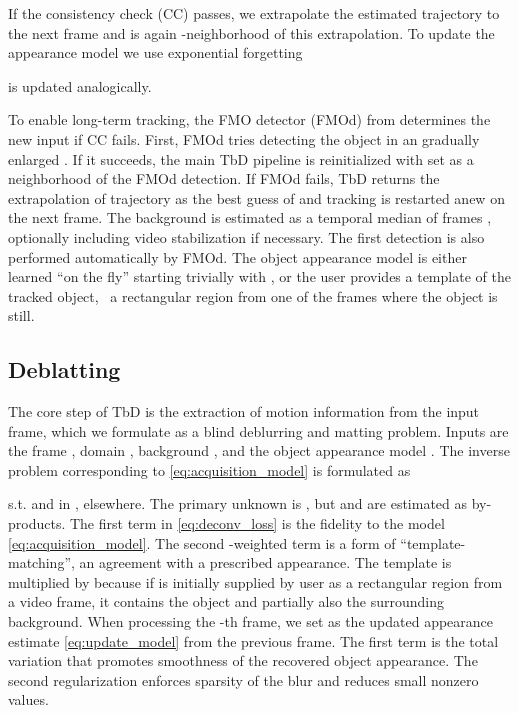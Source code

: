 \documentclass[10pt,twocolumn,letterpaper]{article}
\begin{document}
If the consistency check (CC) passes, we extrapolate the estimated trajectory to the next frame and  is again -neighborhood of this extrapolation. To update the appearance model we use exponential forgetting

 is updated analogically. 

To enable long-term tracking, the FMO detector (FMOd) from \cite{fmo} determines the new input if CC fails.
First, FMOd tries detecting the object in an gradually enlarged . If it succeeds, the main TbD pipeline is reinitialized with  set as a neighborhood of the FMOd detection. If FMOd fails, TbD returns the extrapolation of trajectory  as the best guess of  and tracking is restarted anew on the next frame. The background  is estimated as a temporal median of frames , optionally including video stabilization if necessary. The first detection is also performed automatically by FMOd.  The object appearance model is either learned ``on the fly'' starting trivially with , or the user provides a template of the tracked object, \eg~a rectangular region from one of the frames where the object is still.





\subsection{Deblatting}
\label{sec:deblurring}
The core step of TbD is the extraction of motion information  from the input frame, which we formulate as a blind deblurring and matting problem. Inputs are the frame , domain , background , and the object appearance model . The inverse problem corresponding to \eqref{eq:acquisition_model} is formulated as

s.t.  and  in ,  elsewhere.
The primary unknown is , but  and  are estimated as by-products. The first term in \eqref{eq:deconv_loss} is the fidelity to the model \eqref{eq:acquisition_model}. The second -weighted term is a form of ``template-matching'', an agreement with a prescribed appearance. The template  is multiplied by  because if  is initially supplied by user as a rectangular region from a video frame, it contains the object and partially also the surrounding background. 
When processing the -th frame,
we set  as the updated appearance estimate \eqref{eq:update_model} from the previous frame. The first  term is the total variation that promotes smoothness of the recovered object appearance. The second  regularization enforces sparsity of the blur and reduces small nonzero values.
\end{document}
